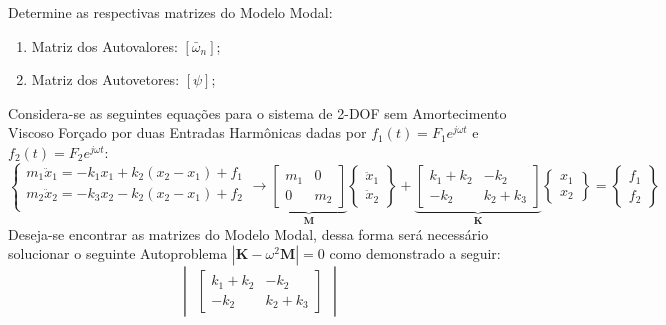 \documentclass{article}
\begin{document}
\newpage\begin{exercise}\label{ex1}
    Determine as respectivas matrizes do Modelo Modal:
    \begin{enumerate}[noitemsep]
        \item Matriz dos Autovalores: $[\bar{\omega}_n]$;
        \item Matriz dos Autovetores: $[\psi]$;
    \end{enumerate}
\end{exercise}
\begin{resolution}
    Considera-se as seguintes equações para o sistema de 2-DOF sem Amortecimento Viscoso Forçado por duas Entradas Harmônicas dadas por $f_1(t) = F_1 e^{j\omega t}$ e $f_2(t) = F_2 e^{j\omega t}$:
    \begin{equation*}
        \begin{cases}
            m_1 \ddot{x}_1 = -k_1 x_1 + k_2 (x_2 - x_1) + f_1\\
            m_2 \ddot{x}_2 = -k_3 x_2 - k_2 (x_2 - x_1) + f_2\\
        \end{cases}
        \to
        \underbrace{\begin{bmatrix} m_1 & 0\\ 0 & m_2\end{bmatrix}}_{\mathbf{M}} 
        \begin{Bmatrix} \ddot{x}_1\\ \ddot{x}_2\end{Bmatrix} + 
        \underbrace{\begin{bmatrix} k_1 + k_2 & -k_2\\ -k_2 & k_2 + k_3\end{bmatrix}}_{\mathbf{K}}
        \begin{Bmatrix} x_1\\ x_2\end{Bmatrix} =
        \begin{Bmatrix} f_1\\f_2\end{Bmatrix} 
    \end{equation*}
    Deseja-se encontrar as matrizes do Modelo Modal, dessa forma será necessário solucionar o seguinte Autoproblema $|\mathbf{K} - \omega^2\mathbf{M}| = 0$ como demonstrado a seguir:
    \begin{equation*}
        \begin{vmatrix}
            \begin{bmatrix} k_1 + k_2 & -k_2\\ -k_2 & k_2 + k_3\end{bmatrix} 

\end{vmatrix}
\end{equation*}
\end{resolution}
\end{document}
